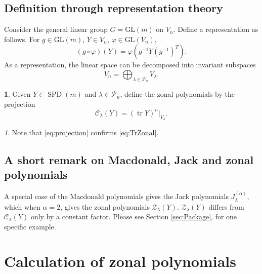 \documentclass{mathincs}
\numberwithin{equation}{section}
\numberwithin{figure}{section}
\theoremstyle{plain}
\theoremstyle{definition}
\newtheorem{defn}[thm]{\protect\definitionname}
\theoremstyle{remark}
\newtheorem{rem}[thm]{\protect\remarkname}
\theoremstyle{plain}
\theoremstyle{definition}
\theoremstyle{plain}
\theoremstyle{plain}
\DeclareMathOperator{\Tr}{tr}
\newcommand{\SPD}{\operatorname{SPD}}
\providecommand{\definitionname}{Definition}
\providecommand{\remarkname}{Remark}
\begin{document}
\subsection{Definition through representation theory}

Consider the general linear group $G=\mathrm{GL}(m)$ on
$V_{n}$. Define a representation as follows. For $g\in\mathrm{GL}(m)$, $Y\in V_n$, $\varphi\in\mathrm{GL}(V_n)$, 
\[
\left(g\circ\varphi\right)(Y)=\varphi\left(g^{-1}Y\left(g^{-1}\right)^{T}\right).
\]
As a representation, the linear space can be decomposed into invariant
subspaces \cite[p.~611]{Representation}
\[
V_{n}=\bigoplus_{\lambda\in\mathcal{P}_{n}}V_{\lambda}.
\]

\begin{defn}
Given $Y\in \SPD(m)$ and $\lambda\in\mathcal{P}_{n}$, define the zonal polynomials by
the projection
\begin{equation}
\mathcal{C}_{\lambda}(Y)=\left(\Tr Y\right)^{n}\Big|_{V_{\lambda}}.\label{eq:projection}
\end{equation}
\end{defn}
\begin{rem}
Note that \eqref{eq:projection} confirms \eqref{eq:TrZonal}. 
\end{rem}

\subsection{A short remark on Macdonald, Jack and zonal polynomials}

A special case of the Macdonald polynomials gives the Jack polynomials $J_{\lambda}^{\left(\alpha\right)}$,
which when $\alpha=2$, gives the zonal polynomials $\mathcal{Z}_\lambda(Y)$. $\mathcal{Z}_\lambda(Y)$ differs from $\mathcal{C}_\lambda(Y)$ only by a constant factor. Please see Section \ref{sec:Package}, for one specific example. 


\section{Calculation of zonal polynomials}\label{sec:calc}
\end{document}
